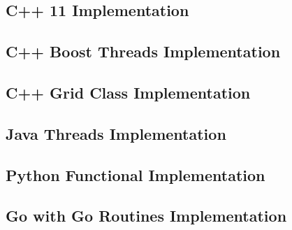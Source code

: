 \documentclass[11pt]{article} %
\begin{document}
\subsection{C++ 11 Implementation}

\pagebreak
\subsection{C++ Boost Threads Implementation}

\pagebreak
\subsection{C++ Grid Class Implementation}

\pagebreak
\subsection{Java Threads Implementation}

\pagebreak
\subsection{Python Functional Implementation}

\pagebreak
\subsection{Go with Go Routines Implementation}

\pagebreak
\end{document}
